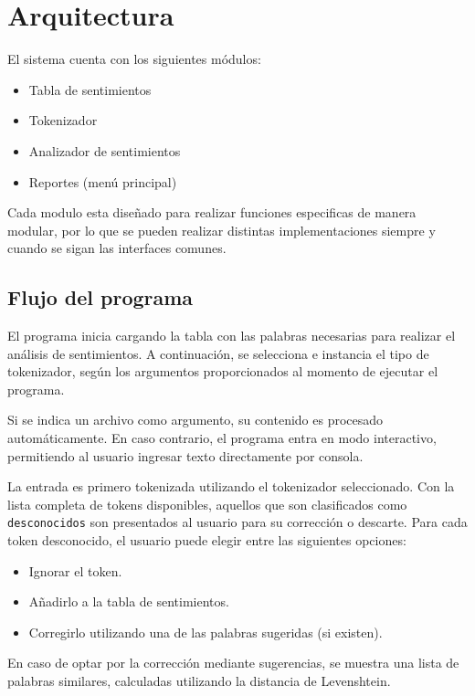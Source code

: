 \section{Arquitectura}

El sistema cuenta con los siguientes módulos:

\begin{itemize}
	\item Tabla de sentimientos
	\item Tokenizador
	\item Analizador de sentimientos
	\item Reportes (menú principal)
\end{itemize}

Cada modulo esta diseñado para realizar funciones especificas de manera modular, por lo que
se pueden realizar distintas implementaciones siempre y cuando se sigan las interfaces comunes.

\subsection{Flujo del programa}
El programa inicia cargando la tabla con las palabras necesarias para realizar el análisis de
sentimientos. A continuación, se selecciona e instancia el tipo de tokenizador, según los
argumentos proporcionados al momento de ejecutar el programa.

Si se indica un archivo como argumento, su contenido es procesado automáticamente. En caso
contrario, el programa entra en modo interactivo, permitiendo al usuario ingresar texto
directamente por consola.

La entrada es primero tokenizada utilizando el tokenizador seleccionado. Con la lista completa
de tokens disponibles, aquellos que son clasificados como \texttt{desconocidos} son presentados
al usuario para su corrección o descarte. Para cada token desconocido, el usuario puede elegir
entre las siguientes opciones:

\begin{itemize}
	\item Ignorar el token.
	\item Añadirlo a la tabla de sentimientos.
	\item Corregirlo utilizando una de las palabras sugeridas (si existen).
\end{itemize}

En caso de optar por la corrección mediante sugerencias, se muestra una lista de palabras
similares, calculadas utilizando la distancia de Levenshtein.

